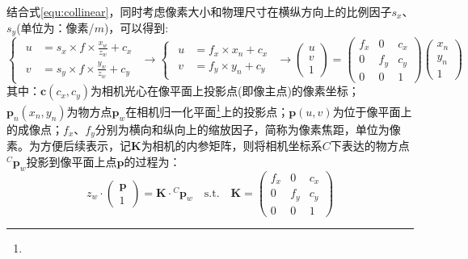 结合式\ref{equ:collinear}，同时考虑像素大小和物理尺寸在横纵方向上的比例因子$s_x$、$s_y$(单位为：像素/$m$)，可以得到:
\begin{equation}
  \label{equ:cam_pinhole}
  \begin{cases}
    \begin{aligned}
      u & =s_x\times f\times\frac{x_w}{z_w}+c_x \\
      v & =s_y\times f\times\frac{y_w}{z_w}+c_y
    \end{aligned}
  \end{cases}\to
  \begin{cases}
    \begin{aligned}
      u & =f_x\times x_n+c_x \\
      v & =f_y\times y_n+c_y
    \end{aligned}
  \end{cases}\to
  \begin{pmatrix}
    u \\v\\1
  \end{pmatrix}=\begin{pmatrix}
    f_x & 0   & c_x \\
    0   & f_y & c_y \\
    0   & 0   & 1
  \end{pmatrix}\begin{pmatrix}
    x_n \\y_n\\1
  \end{pmatrix}
\end{equation}
其中：$\boldsymbol{c}\left( c_x,c_y\right) $为相机光心在像平面上投影点(即像主点)的像素坐标；$\boldsymbol{p}_n\left(
  x_n,y_n\right) $为物方点$\boldsymbol{p}_w$在相机归一化平面\footnote{}上的投影点；$\boldsymbol{p}\left(u,v \right) $为位于像平面上的成像点；$f_x$、$f_y$分别为横向和纵向上的缩放因子，简称为像素焦距，单位为像素。为方便后续表示，记$\boldsymbol{K}$为相机的内参矩阵，则将相机坐标系$C$下表达的物方点${^{C}\boldsymbol{p}_w}$投影到像平面上点$\boldsymbol{p}$的过程为：
\begin{equation}
  z_w\cdot\begin{pmatrix}
    \boldsymbol{p} \\1
  \end{pmatrix}=\boldsymbol{K}\cdot{^{C}\boldsymbol{p}_w}
  \quad\mathrm{s.t.}\quad
  \boldsymbol{K}=\begin{pmatrix}
    f_x & 0   & c_x \\
    0   & f_y & c_y \\
    0   & 0   & 1
  \end{pmatrix}
\end{equation}

